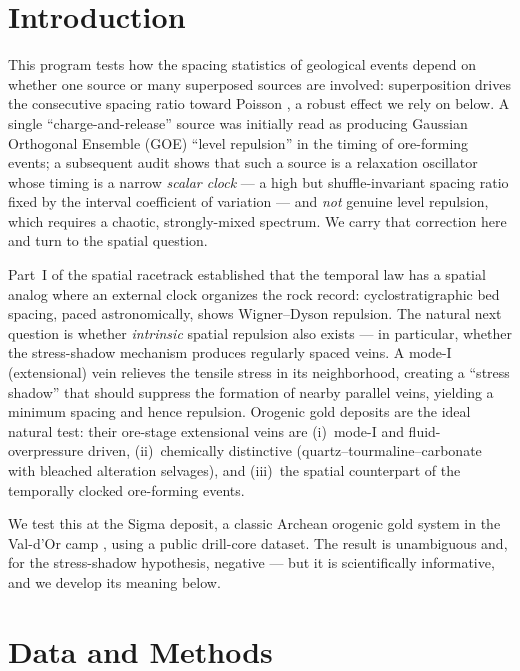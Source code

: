 \documentclass[11pt]{article}
\begin{document}
\section{Introduction}

This program tests how the spacing statistics of geological events depend on
whether one source or many superposed sources are involved: superposition drives
the consecutive spacing ratio toward Poisson \citep{mehta2004}, a robust effect we
rely on below. A single ``charge-and-release'' source was initially read as
producing Gaussian Orthogonal Ensemble (GOE) ``level repulsion'' in the timing of
ore-forming events; a subsequent audit \citep{chen2026audit} shows that such a
source is a relaxation oscillator whose timing is a narrow \emph{scalar clock} ---
a high but shuffle-invariant spacing ratio fixed by the interval coefficient of
variation --- and \emph{not} genuine level repulsion, which requires a chaotic,
strongly-mixed spectrum. We carry that correction here and turn to the spatial
question.

Part~I of the spatial racetrack established that the temporal law has a spatial
analog where an external clock organizes the rock record: cyclostratigraphic
bed spacing, paced astronomically, shows Wigner--Dyson repulsion. The natural
next question is whether \emph{intrinsic} spatial repulsion also exists --- in
particular, whether the stress-shadow mechanism produces regularly spaced veins.
A mode-I (extensional) vein relieves the tensile stress in its neighborhood,
creating a ``stress shadow'' that should suppress the formation of nearby
parallel veins, yielding a minimum spacing and hence repulsion. Orogenic gold
deposits are the ideal natural test: their ore-stage extensional veins are
(i)~mode-I and fluid-overpressure driven, (ii)~chemically distinctive
(quartz--tourmaline--carbonate with bleached alteration selvages), and
(iii)~the spatial counterpart of the temporally clocked ore-forming events.

We test this at the Sigma deposit, a classic Archean orogenic gold system in the
Val-d'Or camp \citep{robert1983}, using a public drill-core dataset. The result
is unambiguous and, for the stress-shadow hypothesis, negative --- but it is
scientifically informative, and we develop its meaning below.

\section{Data and Methods}
\end{document}
